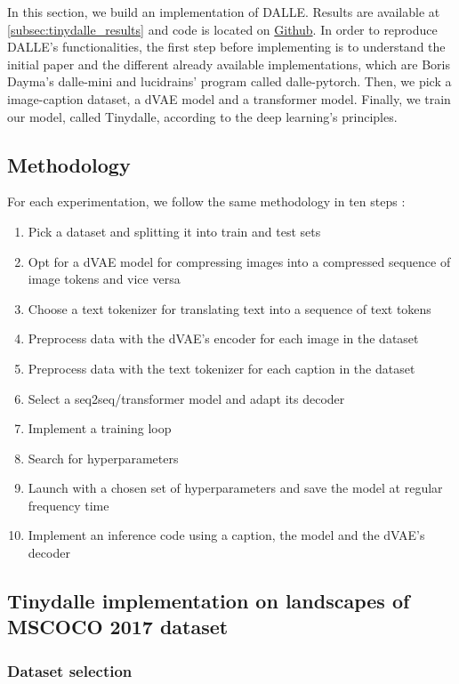 \documentclass{article}
\begin{document}
In this section, we build an implementation of DALLE. Results are available at \ref{subsec:tinydalle_results} and code is located on \href{https://github.com/cthiounn/dalle-tiny}{Github}. In order to reproduce DALLE's functionalities, the first step before implementing is to understand the initial paper and the different already available implementations, which are Boris Dayma's dalle-mini and lucidrains' program called dalle-pytorch. Then, we pick a image-caption dataset, a dVAE model and a transformer model. Finally, we train our model, called Tinydalle, according to the deep learning's principles.

\subsection{Methodology}

For each experimentation, we follow the same methodology in ten steps :

\begin{enumerate}
\item Pick a dataset and splitting it into train and test sets
    \item Opt for a dVAE model for compressing images into a compressed sequence of image tokens and vice versa
    \item Choose a text tokenizer for translating text into a sequence of text tokens
    \item Preprocess data with the dVAE's encoder for each image in the dataset
    \item Preprocess data with the text tokenizer for each caption in the dataset
    \item Select a seq2seq/transformer model and adapt its decoder
    \item Implement a training loop
    \item Search for hyperparameters
    \item Launch with a chosen set of hyperparameters and save the model at regular frequency time
    \item Implement an inference code using a caption, the model and the dVAE's decoder
\end{enumerate}

\subsection{Tinydalle implementation on landscapes of MSCOCO 2017 dataset}

\subsubsection{Dataset selection}
\end{document}
